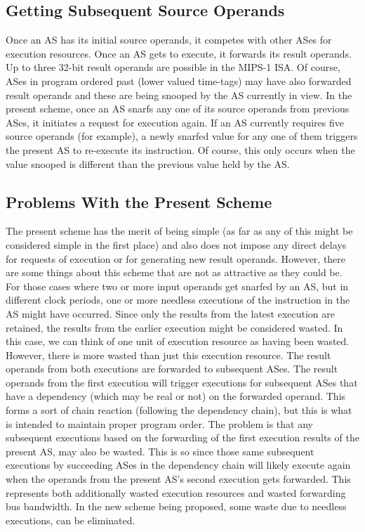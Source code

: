 \documentclass[10pt,dvips]{article}
\begin{document}
\subsection{Getting Subsequent Source Operands}
%
Once an AS has its initial source operands, it competes with
other ASes for execution resources.  Once an AS gets to execute,
it forwards its result operands.  Up to three 32-bit result
operands are possible in the MIPS-1 ISA.
Of course, ASes in program ordered
past (lower valued time-tags) may have also forwarded result
operands and these are being snooped by the AS currently in view.
In the present scheme, once an AS snarfs any one of its
source operands from previous ASes, it initiates a request
for execution again.  If an AS currently requires five
source operands (for example), a newly snarfed value for any
one of them triggers the present AS to re-execute its instruction.
Of course, this only occurs when the value snooped is different
than the previous value held by the AS.
%
\subsection{Problems With the Present Scheme}
%
The present scheme has the merit of being simple (as far as
any of this might be considered simple in the first place)
and also does not impose any direct delays for requests of
execution or for generating new result operands.
However, there are some things about this scheme that are
not as attractive as they could be.
For those cases where two or more input operands get snarfed
by an AS, but in different clock periods, one or more needless
executions of the instruction in the AS might have occurred.
Since only the results from the latest execution are retained,
the results from the earlier execution might be considered
wasted.  In this case, we can think of one unit of execution
resource as having been wasted.  However, there is more wasted
than just this execution resource.  The result operands from both executions
are forwarded to subsequent ASes.  The result operands from the
first execution will trigger executions for subsequent ASes
that have a dependency (which may be real or not) on the forwarded
operand.  This forms a sort of 
chain reaction (following the dependency chain),
but this is 
what is intended to maintain proper program order.
The problem is that any subsequent executions based on the forwarding
of the first execution results of the present AS, may also be wasted.
This is so since those same subsequent executions by succeeding ASes
in the dependency chain will likely
execute again when the operands from the present AS's second
execution gets forwarded.
This represents both additionally wasted execution resources
and wasted forwarding bus bandwidth.
In the new scheme being proposed, some waste due to needless
executions, can be eliminated.
%
\end{document}
